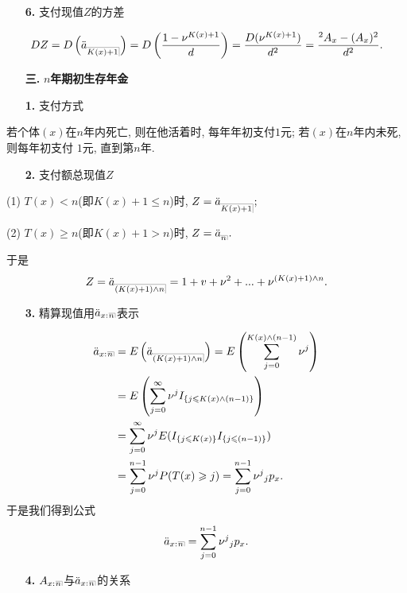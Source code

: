 \documentclass[a4paper,openany, 10pt]{ctexbook}
\makeatletter
\newcommand{\hei}{\CJKfamily{hei}}      %
\def\z{\left}
\def\y{\right}
\DeclareRobustCommand{\annu}[1]{_{%
    \def\arraystretch{0}%
    \setlength\arraycolsep{1pt}%
    \setlength\arrayrulewidth{.2pt}%
    \begin{array}[b]{@{}c|}\hline
        \\[\arraycolsep]%
        \scriptstyle #1%
    \end{array}%
}}
\makeatother
\begin{document}
\begin{itemize}
    \item[{\bf\hei 6.}]支付现值$Z$的方差
\end{itemize}
\begin{align*}
    DZ=D\z(\ddot a_{\annu {K(x)+1}}\y)=D\z(\frac{1-\nu^{K(x)+1}}{d}\y)=\frac{D(\nu^{K(x)+1})}{d^2}=\frac{{}^2A_x-(A_x)^2}{d^2}.
\end{align*}

\begin{itemize}
    \item[{\bf\hei 三.}]{\bf\hei $n$年期初生存年金}
\end{itemize}

\begin{itemize}
    \item[{\bf\hei 1.}]支付方式
\end{itemize}

若个体$(x)$在$n$年内死亡, 则在他活着时, 每年年初支付$1$元; 若$(x)$在$n$年内未死, 则每年初支付
$1$元, 直到第$n$年.

\begin{itemize}
    \item[{\bf\hei 2.}]支付额总现值$Z$
\end{itemize}

(1) $T(x)<n$(即$K(x)+1\leqslant n$)时, $Z=\ddot a_{\annu {K(x)+1}};$

(2) $T(x)\geqslant n$(即$K(x)+1>n$)时, $Z=\ddot a_{\annu {n}}.$

于是$$Z=\ddot a_{\annu {(K(x)+1)\land n}}=1+v+\nu^2+...+\nu^{(K(x)+1)\land n}.$$
\begin{itemize}
    \item[{\bf\hei 3.}]精算现值用$\ddot a_{x:}{}{\annu n}$表示
\end{itemize}
\begin{align*}
    \ddot a_{x:}{}{\annu n} & = E\z(\ddot a_{\annu {(K(x)+1)\land n}}\y)=E\z(\sum_{j=0}^{K(x)\land (n-1)}{\nu^j}\y) \\
                             & =E\z(\sum_{j=0}^{\infty}{\nu^j}I_{\{j\leqslant K(x)\land(n-1)\}}\y)               \\
                             & =\sum_{j=0}^{\infty}{\nu^j}E(I_{\{j\leqslant K(x)\}}I_{\{j\leqslant (n-1)\}}) \\
                             & =\sum_{j=0}^{n-1}{\nu^j}P(T(x)\geqslant j)=\sum_{j=0}^{n-1}{\nu^j}{}_j p_x .
\end{align*}
于是我们得到公式
$$\ddot a_{x:}{}{\annu n}=\sum_{j=0}^{n-1}{\nu^j}{}_j p_x .$$
\begin{itemize}
    \item[{\bf\hei 4.}]$A_{x:}{}{\annu n}$与$\ddot a_{x:}{}{\annu n}$的关系
\end{itemize}
\end{document}
